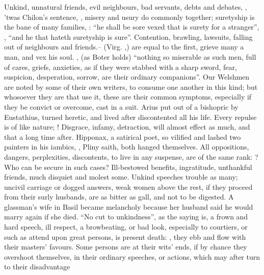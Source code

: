 Unkind, unnatural friends, evil neighbours, bad servants, debts and debates,
\etc{}, 'twas Chilon's sentence, ,
misery and usury do commonly together; suretyship is the bane of many families,
: \enquote{he shall be sore vexed that is surety for a
stranger}, , \enquote{and he that hateth suretyship is
sure}. Contention, brawling, lawsuits, falling out of neighbours and friends.--
 (Virg. ,) are equal to the
first, grieve many a man, and vex his soul. , (as Boter holds) \enquote{nothing so miserable as such
men, full of cares, griefs, anxieties, as if they were stabbed with a sharp
sword, fear, suspicion, desperation, sorrow, are their ordinary companions}.
Our Welshmen are noted by some of their own writers, to
consume one another in this kind; but whosoever they are that use it, these are
their common symptoms, especially if they be convict or overcome,
cast in a suit. Arius put out of a bishopric by
Eustathius, turned heretic, and lived after discontented all his life.
Every repulse is of like nature; ! Disgrace, infamy, detraction, will almost effect as much, and that a
long time after. Hipponax, a satirical poet, so vilified and lashed two
painters in his iambics, ,
Pliny saith, both hanged themselves. All oppositions,
dangers, perplexities, discontents, to live in any
suspense, are of the same rank: ? Who can
be secure in such cases? Ill-bestowed benefits, ingratitude, unthankful
friends, much disquiet and molest some. Unkind speeches trouble as many;
uncivil carriage or dogged answers, weak women above the rest, if they proceed
from their surly husbands, are as bitter as gall, and not to be digested. A
glassman's wife in Basil became melancholy because her husband said he would
marry again if she died. \enquote{No cut to unkindness}, as the saying is, a frown and
hard speech, ill respect, a browbeating, or bad look, especially to courtiers,
or such as attend upon great persons, is present death: , they ebb and flow with their masters' favours. Some
persons are at their wits' ends, if by chance they overshoot themselves, in
their ordinary speeches, or actions, which may after turn to their disadvantage
